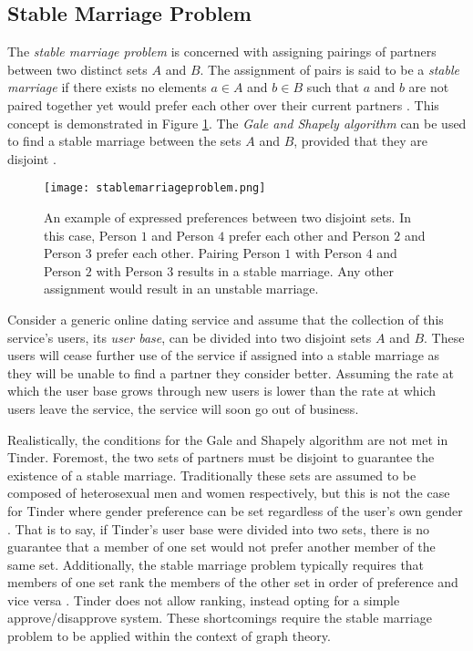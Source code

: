 \subsection{Stable Marriage Problem}
The \textit{stable marriage problem} is concerned with assigning pairings of partners between two distinct sets $A$ and $B$. The assignment of pairs is said to be a \textit{stable marriage} if there exists no elements $a \in A$ and $b \in B$ such that $a$ and $b$ are not paired together yet would prefer each other over their current partners \citep{McVitie1971}. This concept is demonstrated in Figure \ref{fig:smp}. The \textit{Gale and Shapely algorithm} can be used to find a stable marriage between the sets $A$ and $B$, provided that they are disjoint \citep{McVitie1971}. 

\begin{figure}[t]
    \centering
    \texttt{[image: stablemarriageproblem.png]}
    \caption{An example of expressed preferences between two disjoint sets. In this case, Person $1$ and Person $4$ prefer each other and Person $2$ and Person $3$ prefer each other. Pairing Person $1$ with Person $4$ and Person $2$ with Person $3$ results in a stable marriage. Any other assignment would result in an unstable marriage.}
    \label{fig:smp}
\end{figure}

Consider a generic online dating service and assume that the collection of this service's users, its \textit{user base}, can be divided into two disjoint sets $A$ and $B$. These users will cease further use of the service if assigned into a stable marriage as they will be unable to find a partner they consider better. Assuming the rate at which the user base grows through new users is lower than the rate at which users leave the service, the service will soon go out of business.

Realistically, the conditions for the Gale and Shapely algorithm are not met in Tinder. Foremost, the two sets of partners must be disjoint \citep{McVitie1971} to guarantee the existence of a stable marriage. Traditionally these sets are assumed to be composed of heterosexual men and women respectively, but this is not the case for Tinder where gender preference can be set regardless of the user's own gender \citep{Courtois2018}. That is to say, if Tinder's user base were divided into two sets, there is no guarantee that a member of one set would not prefer another member of the same set. Additionally, the stable marriage problem typically requires that members of one set rank the members of the other set in order of preference and vice versa \citep{McVitie1971}. Tinder does not allow ranking, instead opting for a simple approve/disapprove system. These shortcomings require the stable marriage problem to be applied within the context of graph theory.